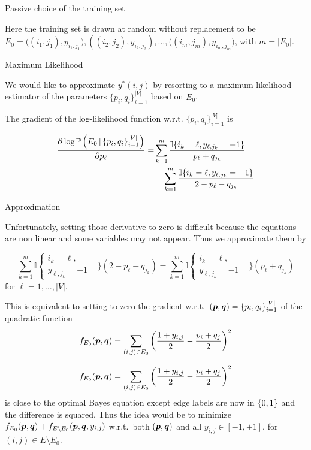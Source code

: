 \documentclass[svgnames,ignorenonframetext,final]{beamer}
\begin{document}
\begin{frame}{Passive choice of the training set}

Here the training set is drawn at random without replacement to be
\(E_0 = \big((i_1,j_1),y_{i_1,j_1}), ((i_2,j_2),y_{i_2,j_2}), \ldots, ((i_m,j_m),y_{i_m,j_m}\big)\),
with \(m = |E_0|\).

\end{frame}

\begin{frame}{Maximum Likelihood}

We would like to approximate \(y^*(i,j)\) by resorting to a maximum
likelihood estimator of the parameters \(\{p_i, q_i\}_{i=1}^{|V|}\)
based on \(E_0\).

The gradient of the log-likelihood function w.r.t.
\(\{p_i, q_i\}_{i=1}^{|V|}\) is

\begin{align*}
\frac{\partial \log \mathbb{P}\left(E_0\,|\, \{p_i, q_i\}_{i=1}^{|V|}\right)}{\partial p_{\ell}}
= 
&\sum_{k=1}^m
\frac{\mathbb{I}\!\left\{{i_k = \ell,y_{\ell,j_k}=+1}\right\}}{p_{\ell}+q_{j_k}} \\
&-
\sum_{k=1}^m
\frac{\mathbb{I}\!\left\{{i_k = \ell,y_{\ell,j_k}=-1}\right\}}{2-p_{\ell}-q_{j_k}}
\end{align*}

\end{frame}


\begin{frame}[allowframebreaks]{Approximation}

Unfortunately, setting those derivative to zero is difficult because the
equations are non linear and some variables may not appear. Thus we
approximate them by

\begin{equation*}\label{e:slp}
  \sum_{k=1}^m \mathbb{I}\begin{cases}
    i_k = \ell, &\\
    y_{\ell,j_k}=+1 &
  \end{cases}
    \Biggr\}
\left(2-p_{\ell}-q_{j_k}\right)
=
\sum_{k=1}^m \mathbb{I}\begin{cases}
  i_k = \ell, &\\
  y_{\ell,j_k}=-1 &
\end{cases}
    \Biggr\}
\left(p_{\ell}+q_{j_k}\right)
\end{equation*}
for $\ell = 1, \ldots, |V|$.

This is equivalent to setting to zero the gradient
w.r.t.~\((\boldsymbol{p},\boldsymbol{q}) =\{p_i, q_i\}_{i=1}^{|V|}\) of the quadratic function
\[f_{E_0}(\boldsymbol{p},\boldsymbol{q}) = \sum_{(i,j) \in E_0} \left(\frac{1+y_{i,j}}{2} - \frac{p_i+q_j}{2} \right)^2\]

\[f_{E_0}(\boldsymbol{p},\boldsymbol{q}) = \sum_{(i,j) \in E_0} \left(\frac{1+y_{i,j}}{2} - \frac{p_i+q_j}{2} \right)^2\]
is close to the optimal Bayes equation except edge labels are now in
\(\{0,1\}\) and the difference is squared. Thus the idea would be to minimize
\(f_{E_0}(\boldsymbol{p},\boldsymbol{q}) + f_{E\setminus E_0}(\boldsymbol{p},\boldsymbol{q}, {y_{i,j}})\)
w.r.t.~both \((\boldsymbol{p},\boldsymbol{q})\) and all \(y_{i,j} \in [-1,+1]\), for
\((i,j)\in E\setminus E_0\).

\end{frame}
\end{document}
